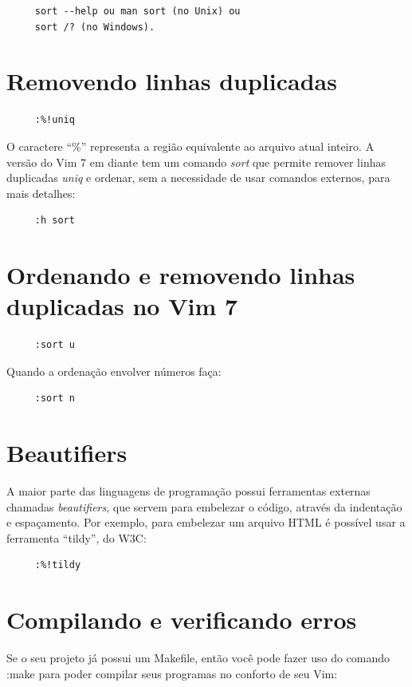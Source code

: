 \documentclass[10pt,a4paper,openany]{book}
\begin{document}
\begin{verbatim}
     sort --help ou man sort (no Unix) ou
     sort /? (no Windows).
\end{verbatim}

\section{Removendo linhas duplicadas}

\begin{verbatim}
     :%!uniq
\end{verbatim}

O caractere ``\%'' representa a região equivalente ao arquivo atual inteiro.
A versão do Vim 7 em diante tem um comando {\em sort} que permite remover
linhas duplicadas {\em uniq} e ordenar, sem a necessidade de usar comandos
externos, para mais detalhes:

\begin{verbatim}
     :h sort
\end{verbatim}

\section{Ordenando e removendo linhas duplicadas no Vim 7}

\begin{verbatim}
     :sort u
\end{verbatim}

Quando a ordenação envolver números faça:

\begin{verbatim}
     :sort n
\end{verbatim}

\section{Beautifiers}

A maior parte das linguagens de programação possui ferramentas
externas chamadas {\em beautifiers}, que servem para embelezar o código,
através da indentação e espaçamento. Por exemplo, para embelezar um
arquivo HTML é possível usar a ferramenta ``tildy'', do W3C:

\begin{verbatim}
     :%!tildy
\end{verbatim}

\section{Compilando e verificando erros}
Se o seu projeto já possui um Makefile, então você pode fazer uso do comando :make
para poder compilar seus programas no conforto de seu Vim:
\end{document}
